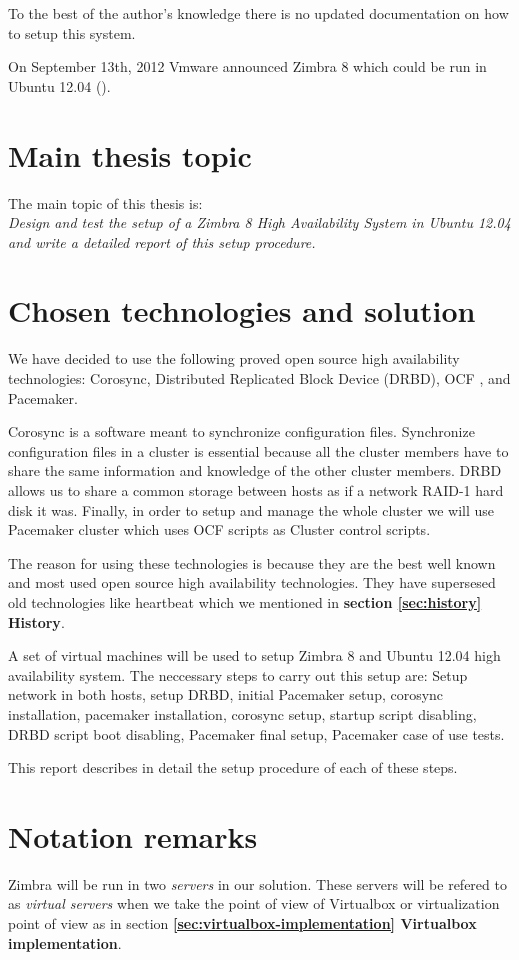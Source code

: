 To the best of the author's knowledge there is no updated documentation on how to setup this system.

On September 13th, 2012 Vmware announced Zimbra 8 which could be run in Ubuntu 12.04 (\cite{VmwareZimbra8Announce}).

\section {Main thesis topic}
The main topic of this thesis is: \\
\textit{Design and test the setup of a Zimbra 8 High Availability System in Ubuntu 12.04 and write a detailed report of this setup procedure.}

\section {Chosen technologies and solution}
We have decided to use the following proved open source high availability technologies: Corosync, Distributed Replicated Block Device (DRBD), OCF , and Pacemaker.

Corosync is a software meant to synchronize configuration files. Synchronize configuration files in a cluster is essential because all the cluster members have to share the same information and knowledge of the other cluster members. DRBD allows us to share a common storage between hosts as if a network RAID-1 hard disk it was. Finally, in order to setup and manage the whole cluster we will use Pacemaker cluster which uses OCF scripts as Cluster control scripts.

The reason for using these technologies is because they are the best well known and most used open source high availability technologies. They have supersesed old technologies like heartbeat which we mentioned in \textbf{section {\ref{sec:history} History}}.

A set of virtual machines will be used to setup Zimbra 8 and Ubuntu 12.04 high availability system. The neccessary steps to carry out this setup are: Setup network in both hosts, setup DRBD, initial Pacemaker setup, corosync installation, pacemaker installation, corosync setup, startup script disabling, DRBD script boot disabling, Pacemaker final setup, Pacemaker case of use tests.

This report describes in detail the setup procedure of each of these steps.

\section {Notation remarks}
Zimbra will be run in two \textit{servers} in our solution. These servers will be refered to as \textit{virtual servers} when we take the point of view of Virtualbox or virtualization point of view as in section \textbf {\ref{sec:virtualbox-implementation} Virtualbox implementation}.

